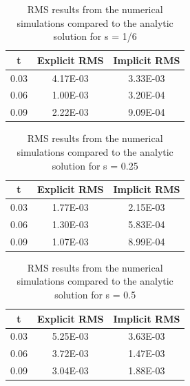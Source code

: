 \documentclass[twocolumn,10pt]{asme2ej}
\begin{document}
\begin{table}[htb]
\begin{center}
\label{table_results1}
\begin{tabular}{|c | c c|}
\hline
t & Explicit RMS & Implicit RMS \\
\hline
0.03 & 4.17E-03 & 3.33E-03\\
0.06 & 1.00E-03 & 3.20E-04\\
0.09 & 2.22E-03 & 9.09E-04\\
\hline
\end{tabular}
\caption{RMS results from the numerical simulations compared to the analytic solution for s = 1/6}
\end{center}
\end{table}
\begin{table}[htb]
\begin{center}
\label{table_results2}
\begin{tabular}{|c | c c|}
\hline
t & Explicit RMS & Implicit RMS \\
\hline
0.03 & 1.77E-03 & 2.15E-03\\
0.06 & 1.30E-03 & 5.83E-04\\
0.09 & 1.07E-03 & 8.99E-04\\
\hline
\end{tabular}
\caption{RMS results from the numerical simulations compared to the analytic solution for s = 0.25}
\end{center}
\end{table}
\begin{table}[htb]
\begin{center}
\label{table_results3}
\begin{tabular}{|c | c c|}
\hline
t & Explicit RMS & Implicit RMS \\
\hline
0.03 & 5.25E-03 & 3.63E-03\\
0.06 & 3.72E-03 & 1.47E-03\\
0.09 & 3.04E-03 & 1.88E-03\\
\hline
\end{tabular}
\caption{RMS results from the numerical simulations compared to the analytic solution for s = 0.5}
\end{center}
\end{table}
\end{document}
